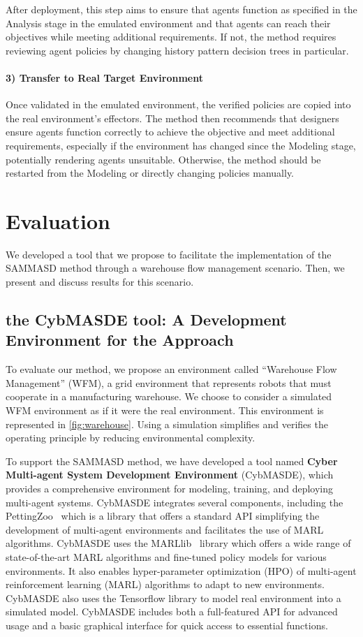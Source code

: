 \documentclass[sigconf,anonymous]{aamas}
\begin{document}
After deployment, this step aims to ensure that agents function as specified in the Analysis stage in the emulated environment and that agents can reach their objectives while meeting additional requirements. If not, the method requires reviewing agent policies by changing history pattern decision trees in particular.

\paragraph{\textbf{3) Transfer to Real Target Environment}}

Once validated in the emulated environment, the verified policies are copied into the real environment's effectors. The method then recommends that designers ensure agents function correctly to achieve the objective and meet additional requirements, especially if the environment has changed since the Modeling stage, potentially rendering agents unsuitable. Otherwise, the method should be restarted from the Modeling or directly changing policies manually.

\section{Evaluation}
\label{sec:evaluation}

We developed a tool that we propose to facilitate the implementation of the SAMMASD method through a warehouse flow management scenario. Then, we present and discuss results for this scenario.

\subsection{the CybMASDE tool: A Development Environment for the Approach}

To evaluate our method, we propose an environment called “Warehouse Flow Management” (WFM), a grid environment that represents robots that must cooperate in a manufacturing warehouse. We choose to consider a simulated WFM environment as if it were the real environment. This environment is represented in \autoref{fig:warehouse}.
Using a simulation simplifies and verifies the operating principle by reducing environmental complexity.

To support the SAMMASD method, we have developed a tool named \textbf{Cyber Multi-agent System Development Environment} (CybMASDE), which provides a comprehensive environment for modeling, training, and deploying multi-agent systems. CybMASDE integrates several components, including the PettingZoo~\cite{Terry2021} which is a library that offers a standard API simplifying the development of multi-agent environments and facilitates the use of MARL algorithms. CybMASDE uses the MARLlib~\cite{hu2022marllib} library which offers a wide range of state-of-the-art MARL algorithms and fine-tuned policy models for various environments. It also enables hyper-parameter optimization (HPO) of multi-agent reinforcement learning (MARL) algorithms to adapt to new environments. CybMASDE also uses the Tensorflow library to model real environment into a simulated model. CybMASDE includes both a full-featured API for advanced usage and a basic graphical interface for quick access to essential functions.
\end{document}
